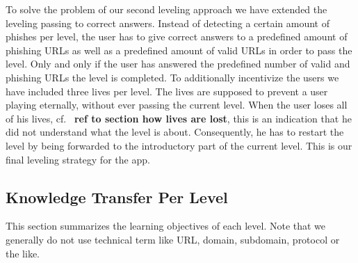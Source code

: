\begin{description}[leftmargin=0cm]
	\item[Leveling Based on Correct Answers] To solve the problem of our second leveling approach we have extended the leveling passing to correct answers. Instead of detecting a certain amount of phishes per level, the user has to give correct answers to a predefined amount of phishing URLs as well as a predefined amount of valid URLs in order to pass the level. Only and only if the user has answered the predefined number of valid and phishing URLs the level is completed. To additionally incentivize the users we have included three lives per level. The lives are supposed to prevent a user playing eternally, without ever passing the current level. When the user loses all of his lives, cf. ~\textbf{ref to section how lives are lost}, this is an indication that he did not understand what the level is about. Consequently, he has to restart the level by being forwarded to the introductory part of the current level. This is our final leveling strategy for the app.
\end{description}
\subsection{Knowledge Transfer Per Level}
This section summarizes the learning objectives of each level. Note that we generally do not use technical term like URL, domain, subdomain, protocol or the like.

